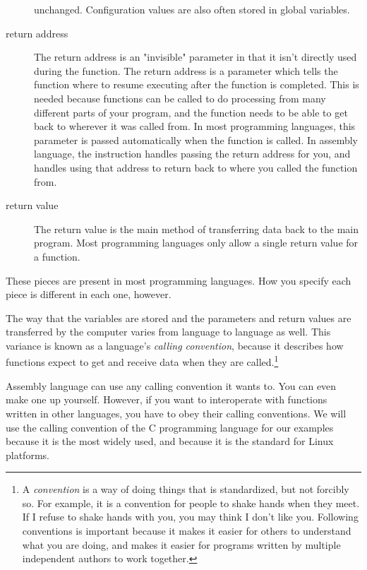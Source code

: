 \begin{description}
{unchanged.}  Configuration values are also often stored in
global variables.
\item[return address] The return address 
is an "invisible" parameter in that it isn't directly used during the function.
The return address is a parameter which tells the function where to resume
executing after the function is completed.   This is needed because 
functions can be
called to do processing from many different parts of your program, and
the function needs to be able to get back to wherever it was called
from.  In most programming languages, this parameter
is passed automatically when the function is called.  In assembly language,
the  instruction handles passing
the return address for you, and  handles
using that address to return back to where you called the function from.
\item[return value] The return value is the 
main method of transferring data back to the
main program.  Most programming languages only allow a single return value 
for a function.
\end{description}

These pieces are present in most programming languages.  How you specify
each piece is different in each one, however.

The way that the variables are stored and the parameters and return values
are transferred by the computer varies from language to language as well.  
This variance is  known as
a language's \emph{calling convention}, because it describes how functions expect
to get and receive data when they are called.\footnote{A 
\emph{convention} is a way of doing things that is standardized,
but not forcibly so.  For example, it is a convention for people to shake
hands when they meet.  If I refuse to shake hands with you, you may think
I don't like you.  Following conventions is important because it makes it
easier for others to understand what you are doing, and makes it easier
for programs written by multiple independent authors to work together.
}

Assembly language can use any calling convention it wants to.  
You can even make one up yourself.  However, if
you want to interoperate with functions written in other 
languages, you have to obey their calling conventions.  We 
will use the calling convention of the C programming language 
for our examples because it is the most widely used, and because it is the standard for Linux platforms.

